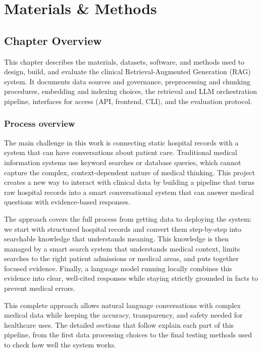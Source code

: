 \chapter{Materials \& Methods}

\section{Chapter Overview}
This chapter describes the materials, datasets, software, and methods used to design, build, and evaluate the clinical Retrieval-Augmented Generation (RAG) system. It documents data sources and governance, preprocessing and chunking procedures, embedding and indexing choices, the retrieval and LLM orchestration pipeline, interfaces for access (API, frontend, CLI), and the evaluation protocol.

\subsection{Process overview}
The main challenge in this work is connecting static hospital records with a system that can have conversations about patient care. Traditional medical information systems use keyword searches or database queries, which cannot capture the complex, context-dependent nature of medical thinking. This project creates a new way to interact with clinical data by building a pipeline that turns raw hospital records into a smart conversational system that can answer medical questions with evidence-based responses.


The approach covers the full process from getting data to deploying the system: we start with structured hospital records and convert them step-by-step into searchable knowledge that understands meaning. This knowledge is then managed by a smart search system that understands medical context, limits searches to the right patient admissions or medical areas, and puts together focused evidence. Finally, a language model running locally combines this evidence into clear, well-cited responses while staying strictly grounded in facts to prevent medical errors.

This complete approach allows natural language conversations with complex medical data while keeping the accuracy, transparency, and safety needed for healthcare uses. The detailed sections that follow explain each part of this pipeline, from the first data processing choices to the final testing methods used to check how well the system works.





